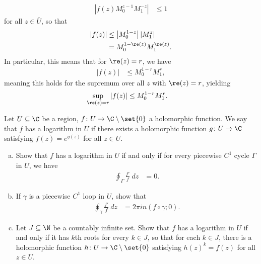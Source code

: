 \documentclass[10pt]{mypackage}
\begin{document}
\begin{solution}
\begin{align*}
    \left\vert f(z)M_0^{z-1}M_1^{-z} \right\vert &\leq 1
  \end{align*}
  for all $z\in \overline{U}$, so that
  \begin{align*}
    \left\vert f(z) \right\vert&\leq \left\vert M_0^{1-z} \right\vert \left\vert M_1^{z} \right\vert\\
                               &= M_0^{1-\re(z)} M_1^{\re(z)}.
  \end{align*}
  In particular, this means that for $\re(z) = r$, we have
  \begin{align*}
    \left\vert f(z) \right\vert &\leq M_0^{1-r}M_1^{r},
  \end{align*}
  meaning this holds for the supremum over all $z$ with $\re(z) = r$, yielding
  \begin{align*}
    \sup_{\re(z) = r} \left\vert f(z) \right\vert &\leq M_0^{1-r}M_1^{r}.
  \end{align*}
\end{solution}
\begin{problem}[Problem 4]
  Let $U\subseteq \C$ be a region, $f\colon U\rightarrow \C\setminus \set{0}$ a holomorphic function. We say that $f$ has a logarithm in $U$ if there exists a holomorphic function $g\colon U\rightarrow \C$ satisfying $f(z) = e^{g(z)}$ for all $z\in U$.
  \begin{enumerate}[(a)]
    \item Show that $f$ has a logarithm in $U$ if and only if for every piecewise $C^{1}$ cycle $\Gamma$ in $U$, we have
      \begin{align*}
        \oint_{\Gamma}^{} \frac{f'}{f}\:dz &= 0.
      \end{align*}
    \item If $\gamma$ is a piecewise $C^{1}$ loop in $U$, show that
      \begin{align*}
        \oint_{\gamma}^{} \frac{f'}{f}\:dz &= 2\pi i n\left( f\circ\gamma;0 \right).
      \end{align*}
    \item Let $J\subseteq \N$ be a countably infinite set. Show that $f$ has a logarithm in $U$ if and only if it has $k$th roots for every $k\in J$, so that for each $k\in J$, there is a holomorphic function $h\colon U\rightarrow \C\setminus \set{0}$ satisfying $h(z)^{k} = f(z)$ for all $z\in U$.
  \end{enumerate}
\end{problem}
\end{document}
